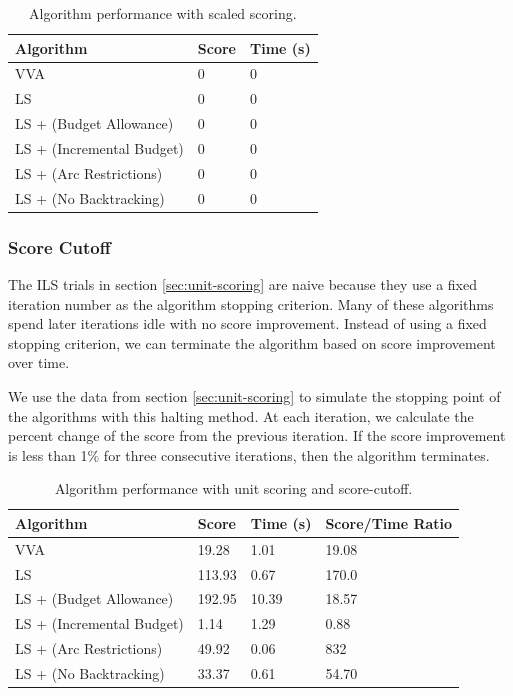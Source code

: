 \documentclass[11pt]{article}
\newcommand{\td}{\todo[inline]}
\begin{document}
\td{Write me}

\begin{table}[h]
\begin{center}
\begin{tabular}{|l|l|l|}
    \hline
    \textbf{Algorithm} & \textbf{Score} & \textbf{Time (s)} \\
    \hline
    VVA & 0 & 0 \\
    \hline
    LS & 0 & 0 \\
    \hline
    LS + (Budget Allowance) & 0 & 0 \\
    \hline
    LS + (Incremental Budget) & 0 & 0 \\
    \hline
    LS + (Arc Restrictions) & 0 & 0 \\
    \hline
    LS + (No Backtracking) & 0 & 0 \\
    \hline
\end{tabular}
\caption{Algorithm performance with scaled scoring.}
\end{center}
\end{table}

\subsubsection{Score Cutoff}
The ILS trials in section \ref{sec:unit-scoring} are naive because they use a fixed iteration number as the algorithm stopping criterion. Many of these algorithms spend later iterations idle with no score improvement. Instead of using a fixed stopping criterion, we can terminate the algorithm based on score improvement over time. 

We use the data from section \ref{sec:unit-scoring} to simulate the stopping point of the algorithms with this halting method. At each iteration, we calculate the percent change of the score from the previous iteration. If the score improvement is less than 1\% for three consecutive iterations, then the algorithm terminates.    

\begin{table}[h]
\begin{center}
\begin{tabular}{|l|l|l|l|}
    \hline
    \textbf{Algorithm} & \textbf{Score} & \textbf{Time (s)} & \textbf{Score/Time Ratio} \\
    \hline
    VVA & 19.28 & 1.01 & 19.08 \\
    \hline
    LS & 113.93 & 0.67 & 170.0 \\
    \hline
    LS + (Budget Allowance) & 192.95 & 10.39 & 18.57 \\
    \hline
    LS + (Incremental Budget) & 1.14 & 1.29 & 0.88 \\
    \hline
    LS + (Arc Restrictions) & 49.92 & 0.06 & 832 \\
    \hline
    LS + (No Backtracking) & 33.37 & 0.61 & 54.70 \\
    \hline
\end{tabular}
\caption{Algorithm performance with unit scoring and score-cutoff.}
\label{tab:score-cuttoff-results}
\end{center}
\end{table}
\end{document}
